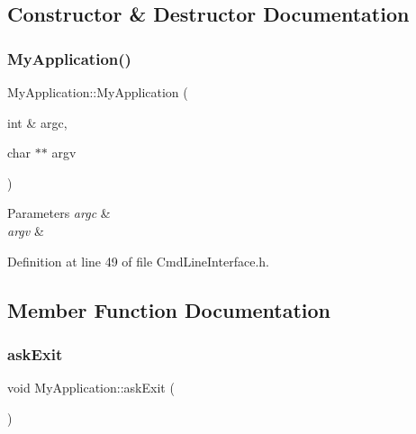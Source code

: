 \subsection{Constructor \& Destructor Documentation}
\mbox{\label{class_my_application_a4b9e70ce40a83d5d4ae99253a6933c02}} 
\subsubsection{\texorpdfstring{My\+Application()}{MyApplication()}}
{\footnotesize\ttfamily My\+Application\+::\+My\+Application (\begin{DoxyParamCaption}\item[{int \&}]{argc,  }\item[{char $\ast$$\ast$}]{argv }\end{DoxyParamCaption})\hspace{0.3cm}{\ttfamily [inline]}}


\begin{DoxyParams}{Parameters}
{\em argc} & \\
\hline
{\em argv} & \\
\hline
\end{DoxyParams}


Definition at line 49 of file Cmd\+Line\+Interface.\+h.



\subsection{Member Function Documentation}
\mbox{\label{class_my_application_acd488def3bf98b1ad2b7ab71507d74b5}} 
\subsubsection{\texorpdfstring{ask\+Exit}{askExit}}
{\footnotesize\ttfamily void My\+Application\+::ask\+Exit (\begin{DoxyParamCaption}{ }\end{DoxyParamCaption})\hspace{0.3cm}{\ttfamily [signal]}}

\mbox{\label{class_my_application_af89ced7a59b1930e7a39abb6c17cd33a}} 
